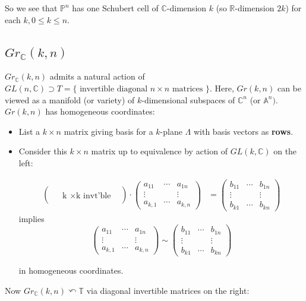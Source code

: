 \documentclass{amsart}
\newcommand{\R}{\mathbb{R}}
\newcommand{\PP}{\mathbb{P}}\newcommand{\A}{\mathbb{A}}\newcommand{\Z}{\mathbb{Z}}\newcommand{\C}{\mathbb{C}}\newcommand{\N}{\mathbb{N}}\newcommand{\T}{\mathbb{T}}
\begin{document}
So we see that $\PP^n$ has one Schubert cell of $\C$-dimension $k$ (so $\R$-dimension $2k$) for each $k, 0\leq k\leq n$. 

\subsection{ $Gr_\C(k,n)$ } 

$Gr_\C(k,n)$ admits a natural action of $GL(n,\C) \supset T = \{\text{ invertible diagonal }n\times n \text{ matrices }\}$. Here, $Gr(k,n)$ can be viewed as a manifold (or variety) of $k$-dimensional subspaces of $\C^n$ (or $\A^n)$. \\

$Gr(k,n)$ has homogeneous coordinates: \begin{itemize} \item List a $k\times n$ matrix giving basis for a $k$-plane $\Lambda$ with basis vectors as \textbf{rows}. \\
\item Consider this $k\times n$ matrix up to equivalence by action of $GL(k,\C)$ on the left:

\begin{align*}
    \left( \begin{matrix} & & \\ & \text{ k }\times \text{k invt'ble}  & \\ & & \end{matrix} \right) \cdot \left(\begin{matrix}  a_{11} & \cdots & a_{1n}\\ \vdots & & \vdots \\ a_{k,1} & \cdots & a_{k,n} \end{matrix}\right) &= \left( \begin{matrix} b_{11} & \cdots & b_{1n}\\ \vdots & & \vdots \\ b_{k1} & \cdots & b_{kn} \end{matrix} \right)
\end{align*}
implies \[  \left(\begin{matrix}  a_{11} & \cdots & a_{1n}\\ \vdots & & \vdots \\ a_{k,1} & \cdots & a_{k,n} \end{matrix}\right) \sim \left( \begin{matrix} b_{11} & \cdots & b_{1n}\\ \vdots & & \vdots \\ b_{k1} & \cdots & b_{kn} \end{matrix} \right) \] 

in homogeneous coordinates. \end{itemize} Now $Gr_\C(k,n) \curvearrowleft \T$ via diagonal invertible matrices on the right: 
\end{document}
